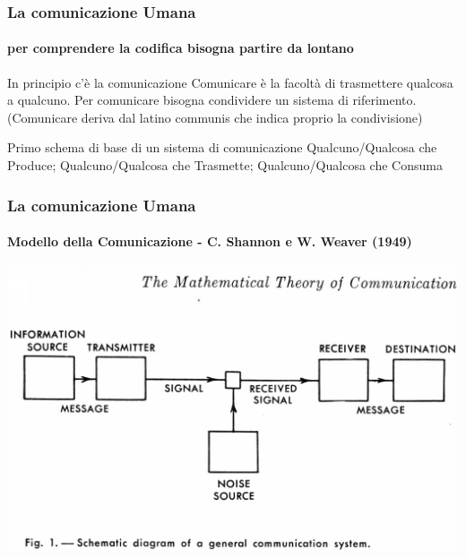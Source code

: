 \begin{frame}
	\frametitle{La comunicazione Umana}
	\framesubtitle{per comprendere la codifica bisogna partire da lontano}
	\addtocounter{nframe}{1}

	\begin{block}{In principio c'è la comunicazione}
		Comunicare è la facoltà di trasmettere qualcosa a qualcuno. Per comunicare bisogna condividere un sistema di riferimento.
		\\(Comunicare deriva dal latino communis che indica proprio la condivisione)
	\end{block}

	\begin{block}{Primo schema di base di un sistema di comunicazione}
		Qualcuno/Qualcosa che Produce; Qualcuno/Qualcosa che Trasmette; Qualcuno/Qualcosa che Consuma
	\end{block}

\end{frame}

\begin{frame}
	\frametitle{La comunicazione Umana}
	\framesubtitle{Modello della Comunicazione - C. Shannon e W. Weaver (1949)}
	\addtocounter{nframe}{1}

	\begin{center}
		\includegraphics[width=.9\textwidth]{imgs/shannon_comm_channel.jpg}
	\end{center}

\end{frame}

